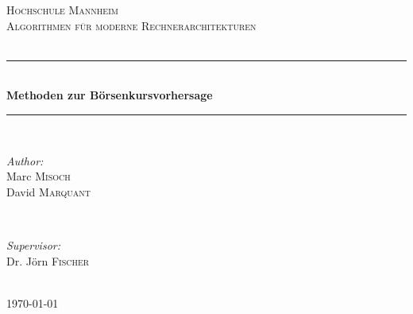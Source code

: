\documentclass[12pt]{article} %
\begin{document}

\begin{titlepage}

\newcommand{\HRule}{\rule{\linewidth}{0.5mm}} %

\center %

\textsc{\LARGE Hochschule Mannheim}\\[1.5cm] %
\textsc{\Large Algorithmen für moderne Rechnerarchitekturen}\\[0.5cm] %
\textsc{\large  }\\[0.5cm] %

\HRule \\[0.4cm]
{ \huge \bfseries Methoden zur Börsenkursvorhersage}\\[0.4cm] %
\HRule \\[1.5cm]

\begin{minipage}{0.4\textwidth}
\begin{flushleft} \large
\emph{Author:}\\
Marc \textsc{Misoch} \\
David \textsc{Marquant} %
\end{flushleft}
\end{minipage}
~
\begin{minipage}{0.4\textwidth}
\begin{flushright} \large
\emph{Supervisor:} \\
Dr. Jörn \textsc{Fischer} %
\end{flushright}
\end{minipage}\\[4cm]

{\large \today}\\[3cm] %


\vfill %

\end{titlepage}
\end{document}
